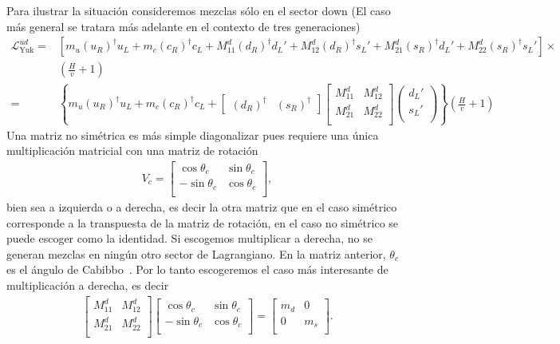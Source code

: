 Para ilustrar la situación consideremos mezclas sólo en el sector down (El caso más general se tratara más adelante en el contexto de tres generaciones)
\begin{align}
  \mathcal{L}_{\text{Yuk}}^{ud}=& \left[ m_u\left( u_R \right)^{\dagger} u_L+m_c \left( c_R \right)^{\dagger}c_L
+  M^{d}_{11}\left( d_R \right)^{\dagger} d_L'+M^d_{12}\left( d_R \right)^{\dagger}s_L' +
  M^d_{21}\left( s_R \right)^{\dagger}d_L'+M^d_{22}\left( s_R \right)^{\dagger}s_L'      \right]\times \nonumber\\
& \left( \frac{H}{v} +1\right) \nonumber\\
=&\left\{ m_u\left( u_R \right)^{\dagger} u_L+m_c \left( c_R \right)^{\dagger}c_L
+\begin{bmatrix}
     \left( d_R \right)^{\dagger} &  \left( s_R \right)^{\dagger}
   \end{bmatrix}
   \begin{bmatrix}
     M^{d}_{11} & M^{d}_{12} \\
     M^{d}_{21} & M^{d}_{22} \\                                      
  \end{bmatrix}
  \begin{pmatrix}
    d_L'\\
    s_L'\\
  \end{pmatrix}
     \right\}
   \left( \frac{H}{v} +1\right) 
\end{align}
Una matriz no simétrica es más simple diagonalizar pues requiere una única multiplicación matricial con una matriz de rotación
\begin{align}
  V_c= \begin{bmatrix}
    \cos\theta_c & \sin\theta_c\\
     -\sin\theta_c & \cos\theta_c  \\
  \end{bmatrix},
\end{align}
bien sea a izquierda o a derecha, es decir la otra matriz que en el caso simétrico corresponde a la transpuesta de la matriz de rotación, en el caso no simétrico se puede escoger como la identidad. Si escogemos multiplicar a derecha, no se generan mezclas en ningún otro sector de Lagrangiano. En la matriz anterior, $\theta_c$ es el ángulo de Cabibbo~\cite{}. Por lo tanto escogeremos el caso más interesante de multiplicación a derecha, es decir
\begin{align}
   \begin{bmatrix}
     M^{d}_{11} & M^{d}_{12} \\
     M^{d}_{21} & M^{d}_{22} \\                                      
  \end{bmatrix}
  \begin{bmatrix}
    \cos\theta_c & \sin\theta_c\\
     -\sin\theta_c & \cos\theta_c  \\
  \end{bmatrix}=
  \begin{bmatrix}
    m_d & 0\\
    0  & m_s\\
  \end{bmatrix}.
\end{align}
